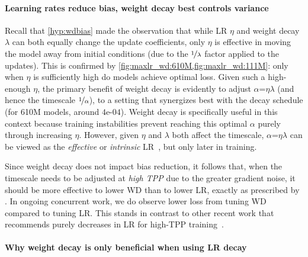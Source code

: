 \paragraph{Learning rates reduce bias, weight decay best controls variance}

Recall that \cref{hyp:wdbias} made the observation that while LR
$\eta$ and weight decay $\lambda$ can both equally change the update
coefficients, only $\eta$ is effective in moving the model away from
initial conditions (due to the $\nicefrac{1}{\lambda}$ factor applied
to the updates).
%
This is confirmed by \cref{fig:maxlr_wd:610M,fig:maxlr_wd:111M}: only
when $\eta$ is sufficiently high do models achieve optimal loss.
%
Given such a high-enough $\eta$, the primary benefit of weight decay
is evidently to adjust $\alpha$=$\eta\lambda$ (and hence the timescale
$\nicefrac{1}{\alpha}$), to a setting that synergizes best with the
decay schedule (for 610M models, around $4$e-$04$).
%
Weight decay is specifically useful in this context because training
instabilities prevent reaching this optimal $\alpha$ purely through
increasing $\eta$.
%
However, given $\eta$ and $\lambda$ both affect the timescale, $\alpha$=$\eta\lambda$
can be viewed as the \emph{effective} or
\emph{intrinsic} LR~\citep{li2020reconciling,wang2024how}, but only
later in training.

Since weight decay does not impact bias reduction, it follows that,
when the timescale needs to be adjusted at \emph{high TPP} due to the
greater gradient noise, it should be more effective to lower WD than
to lower LR, exactly as prescribed by \citet{wang2024how}.
%
In ongoing concurrent work, we do observe lower loss from tuning WD
compared to tuning LR\@.
%
This stands in contrast to other recent work that recommends purely
decreases in LR for high-TPP
training~\citep{shen2024power,bjorck2024scaling}.

\paragraph{Why weight decay is only beneficial when using LR decay}

